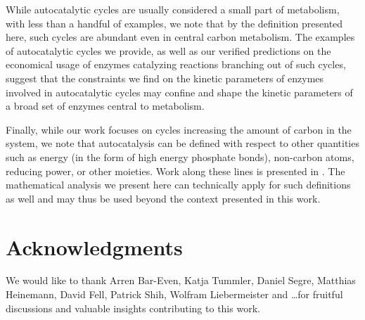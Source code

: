 \documentclass[a4page,notitlepage]{article}
\begin{document}
While autocatalytic cycles are usually considered a small part of metabolism, with less than a handful of examples, we note that by the definition presented here, such cycles are abundant even in central carbon metabolism.
The examples of autocatalytic cycles we provide, as well as our verified predictions on the economical usage of enzymes catalyzing reactions branching out of such cycles, suggest that the constraints we find on the kinetic parameters of enzymes involved in autocatalytic cycles may confine and shape the kinetic parameters of a broad set of enzymes central to metabolism.

  Finally, while our work focuses on cycles increasing the amount of carbon in the system, we note that autocatalysis can be defined with respect to other quantities such as energy (in the form of high energy phosphate bonds), non-carbon atoms, reducing power, or other moieties.
  Work along these lines is presented in \cite{Reich1981-qd}.
  The mathematical analysis we present here can technically apply for such definitions as well and may thus be used beyond the context presented in this work.
\section{Acknowledgments}
We would like to thank Arren Bar-Even, Katja Tummler, Daniel Segre, Matthias Heinemann, David Fell, Patrick Shih, Wolfram Liebermeister  and \dots for fruitful discussions and valuable insights contributing to this work.
{}

\end{document}
